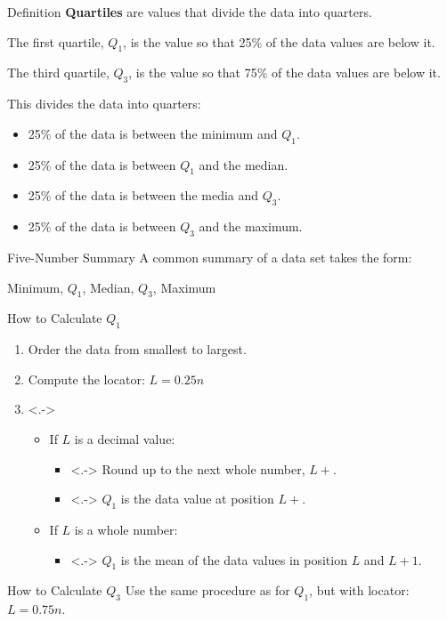 \documentclass{beamer}
\begin{document}
\begin{frame}
\begin{block}{Definition}
\textbf{Quartiles} are values that divide the data into quarters.\pause

\vspace{2mm}
The first quartile, $Q_1$, is the value so that 25\% of the data values are below it. 

\vspace{2mm}
The third quartile, $Q_3$, is the value so that 75\% of the data values are below it.\pause

\vspace{2mm}
This divides the data into quarters:
\begin{itemize}
\item 25\% of the data is between the minimum and $Q_1$.
\item 25\% of the data is between $Q_1$ and the median.
\item 25\% of the data is between the media and $Q_3$.
\item 25\% of the data is between $Q_3$ and the maximum.
\end{itemize}
\end{block}\pause

\begin{block}{Five-Number Summary}
A common summary of a data set takes the form:

Minimum, $Q_1$, Median, $Q_3$, Maximum
\end{block}
\end{frame}

\begin{frame}
\begin{block}{How to Calculate $Q_1$}
\begin{enumerate}[<+->]
\item Order the data from smallest to largest.
\item Compute the locator: $L=0.25n$
\item<.->
\begin{itemize}
\item<+-> If $L$ is a decimal value:
\begin{itemize}
\item<.-> Round up to the next whole number, $L+$.
\item<.-> $Q_1$ is the data value at position $L+$.
\end{itemize}
\item<+-> If $L$ is a whole number:
\begin{itemize}
\item<.-> $Q_1$ is the mean of the data values in position $L$ and $L+1$.
\end{itemize}
\end{itemize}
\end{enumerate}
\end{block}

\onslide<+->
\begin{block}{How to Calculate $Q_3$}
Use the same procedure as for $Q_1$, but with locator: $L=0.75n$.
\end{block}
\end{frame}
\end{document}

